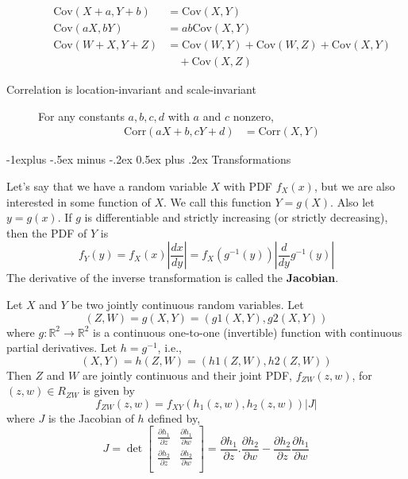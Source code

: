 \documentclass[10pt,landscape]{article}
\makeatletter
\newcommand{\cov}{\textrm{Cov}}
\newcommand{\corr}{\textrm{Corr}}
\renewcommand{\subsection}{\@startsection{subsection}{2}{0mm}%
{-1explus -.5ex minus -.2ex}%
{0.5ex plus .2ex}%
{\normalfont\normalsize\bfseries}}
\makeatother
\begin{document}
\begin{multicols*}{3}
\begin{description}
\begin{align*}
                \cov(X + a, Y + b) & = \cov(X, Y)                           \\
                \cov(aX, bY)       & = ab\cov(X, Y)                         \\
                \cov(W + X, Y + Z) & = \cov(W, Y) + \cov(W, Z) + \cov(X, Y) \\
                & \quad + \cov(X, Z)
            \end{align*}
            \item [Correlation is location-invariant and scale-invariant] For any constants $a,b,c,d$ with $a$ and $c$ nonzero,
            \begin{align*}
                \corr(aX + b, cY + d) & = \corr(X, Y)
            \end{align*}
        \end{description}

        \subsection{Transformations}
        \begin{description}
            \label{one variable transformations}
            \item[One Variable Transformations] Let's say that we have a random variable $X$ with PDF $f_X(x)$, but we are also interested in some function of $X$. We call this function $Y = g(X)$. Also let $y=g(x)$. If $g$ is differentiable and strictly increasing (or strictly decreasing), then the PDF of $Y$ is
            \[
                f_Y(y) = f_X(x)\left|\frac{dx}{dy}\right| = f_X(g^{-1}(y))\left|\frac{d}{dy}g^{-1}(y)\right|
            \]
            The derivative of the inverse transformation is called the \textbf{Jacobian}.

            \item[Two Variable Transformations]
            Let $X$ and $Y$ be two jointly continuous random variables. Let $$(Z,W)=g(X,Y)=(g1(X,Y),g2(X,Y))$$
            where $g:\mathbb{R}^2 \to \mathbb{R}^2 $ is a continuous one-to-one (invertible) function with continuous partial derivatives. Let $h=g^{-1}$, i.e.,
            $$(X,Y)=h(Z,W)=(h1(Z,W),h2(Z,W))$$
            Then $Z$ and $W$ are jointly continuous and their joint PDF, $f_{ZW}(z,w)$, for $(z,w) \in R_{ZW}$ is given by
            $$f_{ZW}(z,w)=f_{XY}(h_1(z,w),h_2(z,w))|J|$$
            where $J$ is the Jacobian of $h$ defined by,
            $$
            J = \det  \begin{bmatrix}
                          \frac{\partial h_1}{\partial z} & \frac{\partial h_1}{\partial w}  \\
                          \frac{\partial h_2}{\partial z}  & \frac{\partial h_2}{\partial w}  \\
            \end{bmatrix}
            = \frac{\partial h_1}{\partial z}.\frac{\partial h_2}{\partial w}-\frac{\partial h_2}{\partial z}\frac{\partial h_1}{\partial w}
            $$


\end{description}
\end{multicols*}
\end{document}
